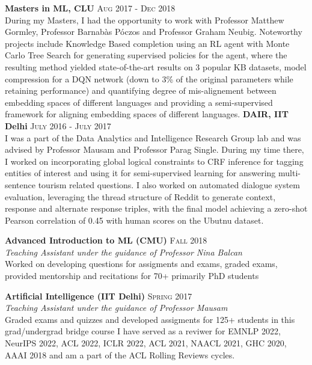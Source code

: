 \documentclass[8pt,a4paper]{article}
\begin{document}
\headedsection
  {\textbf{Masters in ML, CLU}}
  {\textsc{Aug 2017 - Dec 2018}} {%
  {
    \\ During my Masters, I had the opportunity to work with Professor Matthew Gormley, Professor Barnab\`as P\'oczos and Professor Graham Neubig. Noteworthy projects include Knowledge Based completion using an RL agent with Monte Carlo Tree Search for generating supervised policies for the agent, where the resulting method yielded state-of-the-art results on 3 popular KB datasets, model compression for a DQN network (down to 3\% of the original parameters while retaining performance) and quantifying degree of mis-alignement between embedding spaces of different languages and providing a semi-supervised framework for aligning embedding spaces of different languages.
  }
}
\headedsection
  {\textbf{DAIR, IIT Delhi}}
  {\textsc{July 2016 - July 2017}} {%
  {
    \\I was a part of the Data Analytics and Intelligence Research Group lab and was advised by Professor Mausam and Professor Parag Single. During my time there, I worked on incorporating global logical constraints to CRF inference for tagging entities of interest and using it for semi-supervised learning for answering multi-sentence tourism related questions. I also worked on automated dialogue system evaluation, leveraging the thread structure of Reddit to generate context, response and alternate response triples, with the final model achieving a zero-shot Pearson correlation of 0.45 with human scores on the Ubutnu dataset.
  }
}
\spacedhrule{0.6em}{-0.4em}  %

\headedsection
  {\textbf{Advanced Introduction to ML (CMU)}}
  {\textsc{Fall 2018}}{%
    {
      \\\textit{Teaching Assistant under the guidance of Professor Nina Balcan}\\Worked on developing questions for assigments and exams, graded exams, provided mentorship and recitations for 70+ primarily PhD students
    }
  }

\headedsection
  {\textbf{Artificial Intelligence (IIT Delhi)}}
  {\textsc{Spring 2017}}{%
    {
      \\\textit{Teaching Assistant under the guidance of Professor Mausam}\\Graded exams and quizzes and developed assigments for 125+ students in this grad/undergrad bridge course
    }
  }
\pagebreak
\spacedhrule{0.6em}{-0.4em}  %
I have served as a reviwer for EMNLP 2022, NeurIPS 2022, ACL 2022, ICLR 2022, ACL 2021, NAACL 2021, GHC 2020, AAAI 2018 and am a part of the ACL Rolling Reviews cycles.
\spacedhrule{0.6em}{-0.4em}  %
\end{document}
